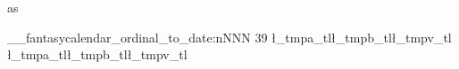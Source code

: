 \documentclass[paper=landscape]{scrartcl}
\begin{document}
\ExplSyntaxOn
as

\__fantasycalendar_ordinal_to_date:nNNN { 39 } \l_tmpa_tl\l_tmpb_tl\l_tmpv_tl
\l_tmpa_tl\l_tmpb_tl\l_tmpv_tl 
\end{document}
